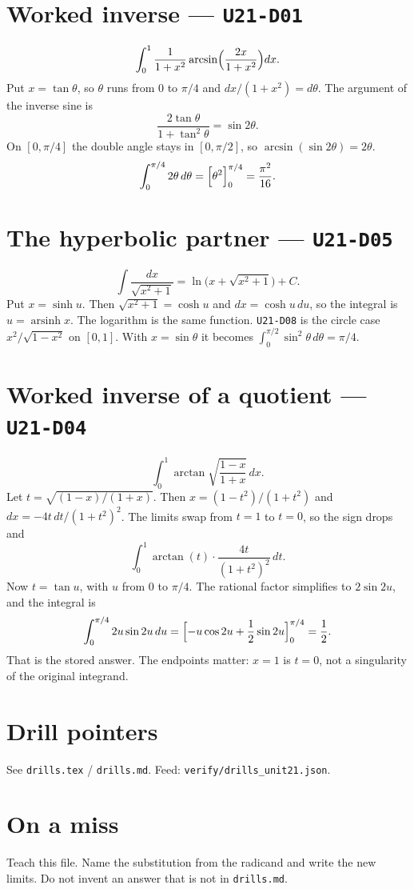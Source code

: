 \section{Worked inverse --- \texttt{U21-D01}}
\[
\int_0^1\frac{1}{1+x^2}\arcsin\Bigl(\frac{2x}{1+x^2}\Bigr)dx.
\]
Put $x=\tan\theta$, so $\theta$ runs from $0$ to $\pi/4$ and $dx/(1+x^2)=d\theta$. The argument of the inverse sine is
\[
\frac{2\tan\theta}{1+\tan^2\theta}=\sin 2\theta.
\]
On $[0,\pi/4]$ the double angle stays in $[0,\pi/2]$, so $\arcsin(\sin 2\theta)=2\theta$.
\[
\int_0^{\pi/4}2\theta\,d\theta=\Bigl[\theta^2\Bigr]_0^{\pi/4}=\frac{\pi^2}{16}.
\]

\section{The hyperbolic partner --- \texttt{U21-D05}}
\[
\int\frac{dx}{\sqrt{x^2+1}}=\ln\bigl(x+\sqrt{x^2+1}\bigr)+C.
\]
Put $x=\sinh u$. Then $\sqrt{x^2+1}=\cosh u$ and $dx=\cosh u\,du$, so the integral is $u=\operatorname{arsinh} x$. The logarithm is the same function. \texttt{U21-D08} is the circle case $x^2/\sqrt{1-x^2}$ on $[0,1]$. With $x=\sin\theta$ it becomes $\int_0^{\pi/2}\sin^2\theta\,d\theta=\pi/4$.

\section{Worked inverse of a quotient --- \texttt{U21-D04}}
\[
\int_0^1\arctan\sqrt{\frac{1-x}{1+x}}\,dx.
\]
Let $t=\sqrt{(1-x)/(1+x)}$. Then $x=(1-t^2)/(1+t^2)$ and $dx=-4t\,dt/(1+t^2)^2$. The limits swap from $t=1$ to $t=0$, so the sign drops and
\[
\int_0^1\arctan(t)\cdot\frac{4t}{(1+t^2)^2}\,dt.
\]
Now $t=\tan u$, with $u$ from $0$ to $\pi/4$. The rational factor simplifies to $2\sin 2u$, and the integral is
\[
\int_0^{\pi/4}2u\sin 2u\,du=\Bigl[-u\cos 2u+\frac12\sin 2u\Bigr]_0^{\pi/4}=\frac12.
\]
That is the stored answer. The endpoints matter: $x=1$ is $t=0$, not a singularity of the original integrand.

\section{Drill pointers}
See \texttt{drills.tex} / \texttt{drills.md}. Feed: \texttt{verify/drills\_unit21.json}.

\section*{On a miss}
Teach this file. Name the substitution from the radicand and write the new limits. Do not invent an answer that is not in \texttt{drills.md}.

